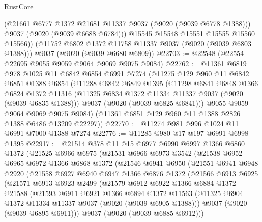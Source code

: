 \begin{lexlean}{RustCore}
\begin{coremodule}
          (@21661 @6777 @1372 @21681 @11337 @9037 (@9020 (@9039 @6778 @1388)))
          @9037
          (@9020 (@9039 @6688 @6784)))
        @15545
        @15548
        @15551
        @15555
        @15560
        @15566))
    (@11752 @6802 @1372 @11758 @11337 @9037 (@9020 (@9039 @6803 @1388)))
    @9037
    (@9020 (@9039 @6680 @6809))
@22703 := @22548 (@22554 @22695 @9055 @9059 @9064 @9069 @9075 @9084)
@22762 := @11361
    @6819
    @978
    @1025
    @11
    @6842
    @6854
    @6991
    @7274
    (@11275
      @129
      @960
      @11
      @6842
      @6851
      @1388
      @6854
      (@11288
        @6842
        @6849
        @1395
        (@11298
          @6841
          @6848
          @1366
          @6824
          @1372
          @11316
          (@11325 @6834 @1372 @11334 @11337 @9037 (@9020 (@9039 @6835 @1388)))
          @9037
          (@9020 (@9039 @6825 @6841)))
        @9055
        @9059
        @9064
        @9069
        @9075
        @9084)
      (@11361 @6851 @129 @960 @11 @1388 @2826 @1388 @6486 @13209 @22297))
@22770 := @11274 @981 @996 @1024 @11 @6991 @7000 @1388 @7274
@22776 := @11285 @980 @17 @197 @6991 @6998 @1395
@22917 := @21514
    @378
    @11
    @15
    @6977
    @6990
    @6997
    @1366
    @6860
    @1372
    (@21525
      @6966
      @6975
      (@21531
        @6966
        @6973
        @3542
        (@21538
          @6952
          @6965
          @6972
          @1366
          @6868
          @1372
          (@21546
            @6941
            @6950
            (@21551
              @6941
              @6948
              @2920
              (@21558
                @6927
                @6940
                @6947
                @1366
                @6876
                @1372
                (@21566
                  @6913
                  @6925
                  (@21571
                    @6913
                    @6923
                    @2499
                    (@21579
                      @6912
                      @6922
                      @1366
                      @6884
                      @1372
                      @21588
                      (@21593
                        @6911
                        @6921
                        @1366
                        @6894
                        @1372
                        @11563
                        (@11325 @6904 @1372 @11334 @11337 @9037 (@9020 (@9039 @6905 @1388)))
                        @9037
                        (@9020 (@9039 @6895 @6911)))
                      @9037
                      (@9020 (@9039 @6885 @6912)))

\end{coremodule}
\end{lexlean}
